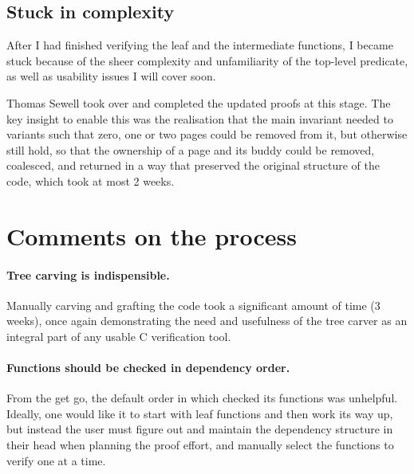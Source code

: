 \subsection{Stuck in complexity}

After I had finished verifying the leaf and the intermediate functions, I
became stuck because of the sheer complexity and unfamiliarity of the top-level
predicate, as well as usability issues I will cover soon.

Thomas Sewell took over and completed the updated proofs at this stage. The key
insight to enable this was the realisation that the main invariant needed to
variants such that zero, one or two pages could be removed from it, but
otherwise still hold, so that the ownership of a page and its buddy could be
removed, coalesced, and returned in a way that preserved the original structure
of the code, which took at most 2 weeks.

\section{Comments on the process}

\paragraph{Tree carving is indispensible.} Manually carving and grafting the
code took a significant amount of time (3 weeks), once again demonstrating the
need and usefulness of the tree carver as an integral part of any usable C
verification tool.

\paragraph{Functions should be checked in dependency order.} From the get go,
the default order in which  checked its functions was unhelpful.
Ideally, one would like it to start with leaf functions and then work its way
up, but instead the user must figure out and maintain the dependency structure
in their head when planning the proof effort, and manually select the functions
to verify one at a time.

